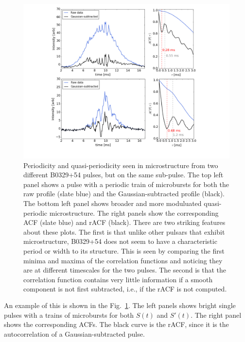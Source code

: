 \begin{figure}[!h]
\vspace{-0.1cm}
\begin{center}
\includegraphics[trim={2in 1in 2in 0in}, width=\textwidth]{./figures/microstructure/quasi_periodicity.jpeg}
\caption{Periodicity and quasi-periodicity seen in 
     microstructure from 
     two different B0329+54 pulses, but on the same sub-pulse. 
     The top left panel shows a pulse with a periodic train of microbursts
     for both the raw profile (slate blue) and the 
     Gaussian-subtracted profile (black). The bottom 
     left panel shows broader and more moduluated 
     quasi-periodic microstructure. The right panels 
     show the corresponding ACF (slate blue) and rACF (black). 
     There are two striking features about these plots. The first 
     is that unlike other pulsars that exhibit microstructure,
     B0329+54 does not seem to have a characteristic period or width 
     to its structure. This is seen by comparing the first 
     minima and maxima of the correlation functions and 
     noticing they are at different timescales for the two 
     pulses. The second 
     is that the correlation function contains very little 
     information if a smooth component is not first subtracted, i.e., if 
     the rACF is not computed.}
\label{fig-quasistruct}
\end{center}
\end{figure}


An example of this is 
shown in the Fig.~\ref{fig-quasistruct}. The left 
panels shows bright single pulses with a
trains of microbursts for both $S(t)$ and $S'(t)$.
The right panel shows the corresponding ACFs. The 
black curve is the rACF, since it is 
the autocorrelation of a Gaussian-subtracted pulse. 

